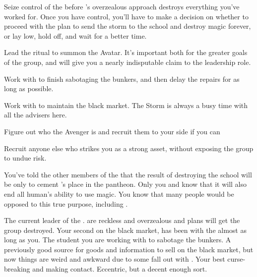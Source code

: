 \documentclass[char]{GL2020}
\begin{document}
\begin{itemz}[Goals]
	\item Seize control of the \pGoaties{} before \cChupLeader{}’s overzealous approach destroys everything you’ve worked for. Once you have control, you’ll have to make a decision on whether to proceed with the plan to send the storm to the school and destroy magic forever, or lay low, hold off, and wait for a better time.
	\item Lead the ritual to summon the \cGenesis{} Avatar. It’s important both for the greater goals of the group, and will give you a nearly indisputable claim to the leadership role.
	\item Work with \cChupStudent{} to finish sabotaging the bunkers, and then delay the repairs for as long as possible.
	\item Work with \cChupInventor{} to maintain the black market. The Storm is always a busy time with all the advisers here.
	\item Figure out who the Avenger is and recruit them to your side if you can 
\item Recruit anyone else who strikes you as a strong asset, without exposing the group to undue risk.
\end{itemz}

\begin{itemz}[Notes]
	\item You’ve told the other members of the \pGoaties{} that the result of destroying the school will be only to cement \cGenesis{}’s place in the pantheon. Only you and \cChupLeader{} know that it will also end all human’s ability to use magic. You know that many people would be opposed to this true purpose, including \cChupInventor{}.
\end{itemz}

\begin{contacts}
	\contact{\cChupLeader{}} The current leader of the \pGoaties{}. \cChupLeader{\They} are reckless and overzealous and \cChupLeader{\their} plans will get the group destroyed.
	\contact{\cChupInventor{}} Your second on the black market, \cChupInventor{} has been with the \pGoaties{} almost as long as you.
	\contact{\cChupStudent{}} The student you are working with to sabotage the bunkers.
	\contact{\cEthics{}} A previously good source for goods and information to sell on the black market, but now things are weird and awkward due to some fall out with \cLibrarian{}.
	\contact{\cCurse{}} Your best curse-breaking and making contact. Eccentric, but a decent enough sort.
\end{contacts}
\end{document}
